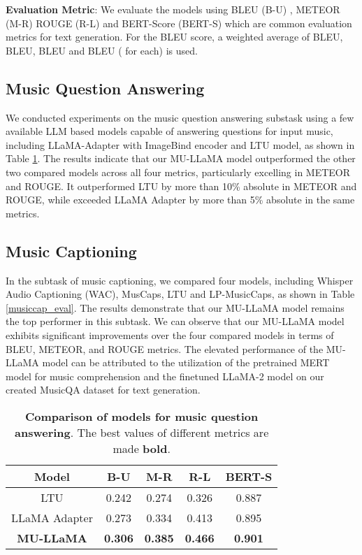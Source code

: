 \documentclass{article}
\begin{document}
\noindent
\textbf{Evaluation Metric}: We evaluate the models using BLEU (B-U) \cite{papineni-etal-2002-bleu}, METEOR (M-R) \cite{banerjee-lavie-2005-meteor} ROUGE (R-L) \cite{lin-2004-rouge} and BERT-Score (BERT-S) \cite{bert-score} which are common evaluation metrics for text generation. For the BLEU score, a weighted average of BLEU, BLEU, BLEU and BLEU ( for each) is used.

\vspace{-0.2cm}
\subsection{Music Question Answering}
\label{ssec:musicqa_exp}

\noindent
We conducted experiments on the music question answering substask using a few available LLM based models capable of answering questions for input music, including LLaMA-Adapter \cite{zhang2023llamaadapter,gao2023llamaadapter} with ImageBind encoder and LTU model, as shown in Table \ref{musicqa_eval}. The results indicate that our MU-LLaMA model outperformed the other two compared models across all four metrics, particularly excelling in METEOR and ROUGE. It outperformed LTU by more than 10\% absolute in METEOR and ROUGE, while exceeded LLaMA Adapter by more than 5\% absolute in the same metrics.


\vspace{-0.3cm}
\subsection{Music Captioning}
\label{ssec:musiccap_exp}

\noindent
In the subtask of music captioning, we compared four models, including Whisper Audio Captioning (WAC), MusCaps, LTU and LP-MusicCaps, as shown in Table \ref{musiccap_eval}. The results demonstrate that our MU-LLaMA model remains the top performer in this subtask. We can observe that our MU-LLaMA model exhibits significant improvements over the four compared models in terms of BLEU, METEOR, and ROUGE metrics. The elevated performance of the MU-LLaMA model can be attributed to the utilization of the pretrained MERT model for music comprehension and the finetuned LLaMA-2 model on our created MusicQA dataset for text generation.

\begin{table}[ht!]
\centering
\def\arraystretch{1.1}\caption{\textbf{Comparison of models for music question answering}. The best values of different metrics are made \textbf{bold}.}
\begin{tabular}{c|c|c|c|c}
\hline\hline
Model & \textbf{B-U} & \textbf{M-R} & \textbf{R-L} & \textbf{BERT-S} \\ \hline\hline
LTU & 0.242 & 0.274 & 0.326 & 0.887 \\
LLaMA Adapter & 0.273 & 0.334 & 0.413 & 0.895 \\
\textbf{MU-LLaMA} & \textbf{0.306} & \textbf{0.385} & \textbf{0.466} & \textbf{0.901} \\ \hline\hline
\end{tabular}
\label{musicqa_eval}
\end{table}
\vspace{-4mm}
\end{document}
